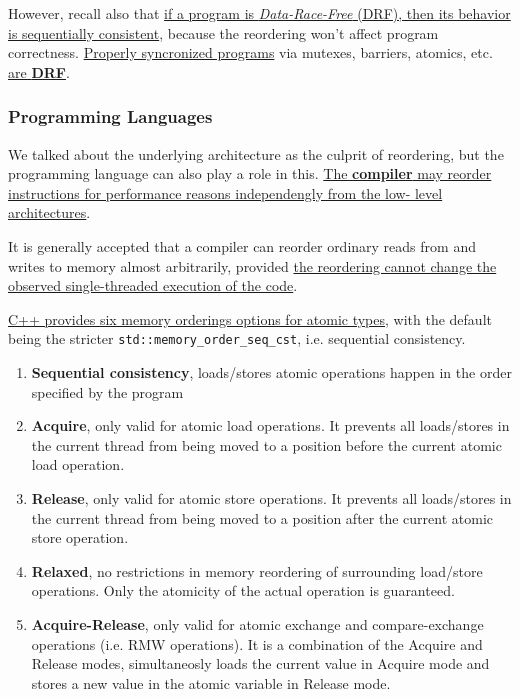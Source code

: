 However, recall also that \ul{if a program is \textit{Data-Race-Free} (DRF), then its behavior is sequentially consistent}, because the reordering won't affect program correctness.
\ul{Properly syncronized programs} via mutexes, barriers, atomics, etc. \ul{are \textbf{DRF}}.



\subsubsection{Programming Languages}
We talked about the underlying architecture as the culprit of reordering, but the programming language can also play a role in this.
\ul{The \textbf{compiler} may reorder instructions for performance reasons independengly from the low-
level architectures}.

It is generally accepted that a compiler can reorder ordinary reads from and writes to memory almost arbitrarily, provided \ul{the reordering cannot change the observed single-threaded execution of the code}.\nl

{\ul{C++ provides six memory orderings options for atomic types}, with the default being the stricter \lstinline|std::memory_order_seq_cst|, i.e. sequential consistency.\ns
\begin{enumerate}
	\item \textbf{Sequential consistency}, loads/stores atomic operations happen in the order specified by the program
	\item \textbf{Acquire}, only valid for atomic load operations. It prevents all loads/stores in the current thread from being moved to a position before the current atomic load operation.
	\item \textbf{Release}, only valid for atomic store operations. It prevents all loads/stores in the current thread from being moved to a position after the current atomic store operation.
	\item \textbf{Relaxed}, no restrictions in memory reordering of surrounding load/store operations. Only the atomicity of the actual operation is guaranteed.
	\item \textbf{Acquire-Release}, only valid for atomic exchange and compare-exchange operations (i.e. RMW operations). It is a combination of the Acquire and Release modes, simultaneosly loads the current value in Acquire mode and stores a new value in the atomic variable in Release mode.
\end{enumerate}}

